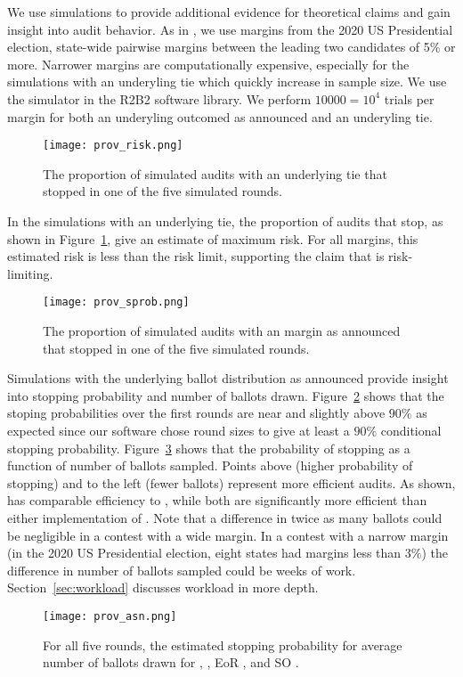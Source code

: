 We use simulations to provide additional evidence for theoretical claims and gain insight into audit behavior. As in \cite{sims}, we use margins from the 2020 US Presidential election, state-wide pairwise margins between the leading two candidates of 5\% or more. Narrower margins are computationally expensive, especially for the simulations with an underyling tie which quickly increase in sample size. We use the simulator in the R2B2 software library\cite{r2b2}. We perform $10000=10^4$ trials per margin for both an underyling outcomed as announced and an underyling tie.

\begin{figure}
\texttt{[image: prov\_risk.png]}
\caption{The proportion of simulated audits with an underlying tie that stopped in one of the five simulated rounds.}
\label{fig:prov-risk}
\end{figure}

In the simulations with an underlying tie, the proportion of audits that stop, as shown in Figure~\ref{fig:prov-risk}, give an estimate of maximum risk. For all margins, this estimated risk is less than the risk limit, supporting the claim that \Providence is risk-limiting.

\begin{figure}
\texttt{[image: prov\_sprob.png]}
\caption{The proportion of simulated audits with an margin as announced that stopped in one of the five simulated rounds.}
\label{fig:prov-sprob}
\end{figure}

Simulations with the underlying ballot distribution as announced provide insight into stopping probability and number of ballots drawn. Figure~\ref{fig:prov-sprob} shows that the stoping probabilities over the first rounds are near and slightly above $90\%$ as expected since our software chose round sizes to give at least a $90\%$ conditional stopping probability.
Figure~\ref{fig:prov-asn} shows that the probability of stopping as a function of number of ballots sampled. Points above (higher probability of stopping) and to the left (fewer ballots) represent more efficient audits. As shown, \Providence has comparable efficiency to \Minerva, while both are significantly more efficient than either implementation of \BRAVO. Note that a difference in twice as many ballots could be negligible in a contest with a wide margin. In a contest with a narrow margin (in the 2020 US Presidential election, eight states had margins less than $3\%$) the difference in number of ballots sampled could be weeks of work. Section~\ref{sec:workload} discusses workload in more depth.

\begin{figure}
\texttt{[image: prov\_asn.png]}
\caption{For all five rounds, the estimated stopping probability for average number of ballots drawn for \Providence, \Minerva, EoR \BRAVO, and SO \BRAVO.}
\label{fig:prov-asn}
\end{figure}








